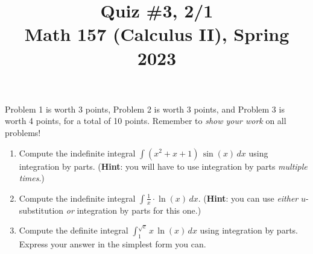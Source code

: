 \documentclass[11pt]{article}
\title{Quiz \#3, 2/1 \\ Math 157 (Calculus II), Spring 2023}
\date{}
\begin{document}
\maketitle

\thispagestyle{empty}

\vspace{-2cm}

Problem 1 is worth 3 points, Problem 2 is worth 3 points, and Problem 3 is worth 4 points, for a total of 10 points. Remember to \emph{show your work} on all problems!

\begin{enumerate}
\item Compute the indefinite integral $\displaystyle \int (x^2+x+1) \, \sin(x) \, dx$ using integration by parts. ({\bf Hint}: you will have to use integration by parts \emph{multiple times}.)

\vspace{5cm}

\item Compute the indefinite integral $\displaystyle \int \frac{1}{x} \cdot \ln(x) \, dx$. ({\bf Hint}: you can use \emph{either} $u$-substitution \emph{or} integration by parts for this one.)

\vspace{5cm}

\item Compute the definite integral $\displaystyle \int_{1}^{\sqrt{e}} x \, \ln(x) \, dx$ using integration by parts. Express your answer in the simplest form you can.

\end{enumerate}
\end{document}
